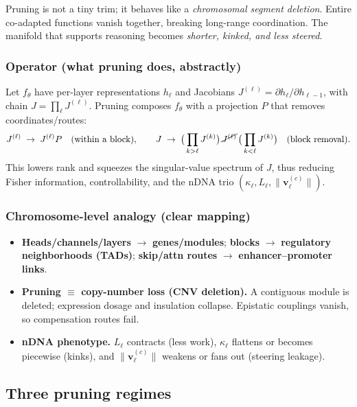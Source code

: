 \begin{tcolorbox}[colback=black!3,colframe=black!40,title=\textbf{Plain-language summary}]
Pruning is not a tiny trim; it behaves like a \emph{chromosomal segment deletion}. Entire co-adapted functions vanish together, breaking long-range coordination. 
The manifold that supports reasoning becomes \emph{shorter, kinked, and less steered}.
\end{tcolorbox}

\subsubsection*{Operator (what pruning does, abstractly)}
Let $f_\theta$ have per-layer representations $h_\ell$ and Jacobians $J^{(\ell)}=\partial h_\ell/\partial h_{\ell-1}$, with chain $J=\prod_\ell J^{(\ell)}$.
Pruning composes $f_\theta$ with a projection $P$ that removes coordinates/routes:
\[
J^{(\ell)} \;\to\; J^{(\ell)} P \quad \text{(within a block)}, 
\qquad 
J \;\to\; \big(\prod_{k>\ell} J^{(k)}\big)\, \cancel{J^{(\ell)}} \,\big(\prod_{k<\ell} J^{(k)}\big) \quad \text{(block removal)}.
\]
This lowers rank and squeezes the singular-value spectrum of $J$, thus reducing Fisher information, controllability, and the nDNA trio $(\kappa_\ell,L_\ell,\|\mathbf v^{(c)}_\ell\|)$.

\subsubsection*{Chromosome-level analogy (clear mapping)}
\begin{itemize}[leftmargin=1.2em]
  \item \textbf{Heads/channels/layers} $\to$ \textbf{genes/modules}; \textbf{blocks} $\to$ \textbf{regulatory neighborhoods (TADs)}; \textbf{skip/attn routes} $\to$ \textbf{enhancer–promoter links}.
  \item \textbf{Pruning $\equiv$ copy-number loss (CNV deletion).} A contiguous module is deleted; expression dosage and insulation collapse. Epistatic couplings vanish, so compensation routes fail.
  \item \textbf{nDNA phenotype.} $L_\ell$ contracts (less work), $\kappa_\ell$ flattens or becomes piecewise (kinks), and $\|\mathbf v^{(c)}_\ell\|$ weakens or fans out (steering leakage).
\end{itemize}

\subsection*{Three pruning regimes}

